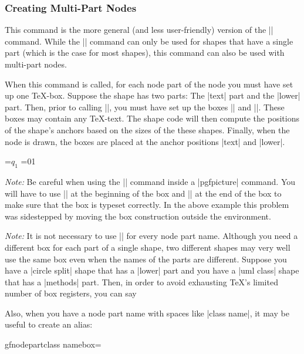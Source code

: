 \subsubsection{Creating Multi-Part Nodes}

\begin{command}{\pgfmultipartnode{}}
  This command is the more general (and less user-friendly) version of
  the |\pgfnode| command. While the |\pgfnode| command can only be
  used for shapes that have a single part (which is the case for most
  shapes), this command can also be used with multi-part nodes.

  When this command is called, for each node part of the node you must
  have set up one \TeX-box. Suppose the shape has two parts: The |text|
  part and the |lower| part. Then, prior to calling
  |\pgfmultipartnode|, you must have set up the boxes
  |\pgfnodeparttextbox| and |\pgfnodepartlowerbox|. These boxes may
  contain any \TeX-text. The shape code will then compute the
  positions of the shape's anchors based on the sizes of the these
  shapes. Finally, when the node is drawn, the boxes are placed at the
  anchor positions |text| and |lower|.

\begin{codeexample}[]
\setbox\pgfnodeparttextbox=\hbox{$q_1$}
\setbox\pgfnodepartlowerbox=\hbox{01}
\begin{pgfpicture}
\end{pgfpicture}
\end{codeexample}

  \emph{Note:\/} Be careful when using the |\setbox| command inside a
  |{pgfpicture}| command. You will have to use |\pgfinterruptpath| at
  the beginning of the box and |\endpgfinterruptpath| at the end of
  the box to make sure that the box is typeset correctly. In the above
  example this problem was sidestepped by moving the box construction
  outside the environment.

  \emph{Note:\/} It is not necessary to use |\newbox| for every node
  part name. Although you need a different box for each part of a
  single shape, two different shapes may very well use the same box
  even when the names of the parts are different. Suppose you have a
  |circle split| shape that has a |lower| part and you have a
  |uml class| shape that has a |methods| part. Then, in order to avoid
  exhausting \TeX's limited number of box registers, you can say
\begin{codeexample}
\newbox\pgfnodepartlowerbox
\let\pgfnodepartmethodsbox=\pgfnodepartlowerbox
\end{codeexample}
  Also, when you have a node part name with spaces like |class name|,
  it may be useful to create an alias:
\begin{codeexample}
\newbox\mybox
\expandafter\let\csname pgfnodepartclass namebox\endcsname=\mybox
\end{codeexample}
\end{command}

